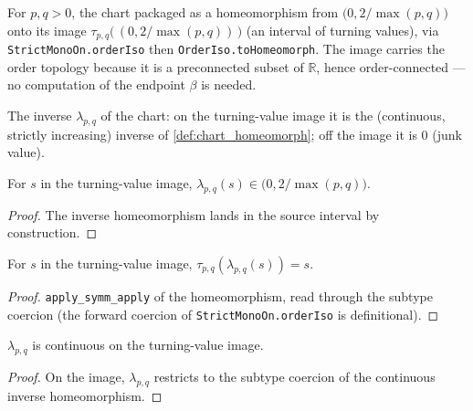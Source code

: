 \begin{definition}
  \label{def:chart_homeomorph}
  For $p, q > 0$, the chart packaged as a homeomorphism from
  $\bigl(0, 2/\max(p,q)\bigr)$ onto its image
  $\tau_{p,q}\bigl(\,(0, 2/\max(p,q))\,\bigr)$ (an interval of turning values),
  via \texttt{StrictMonoOn.orderIso} then \texttt{OrderIso.toHomeomorph}. The
  image carries the order topology because it is a preconnected subset of
  $\mathbb{R}$, hence order-connected --- no computation of the endpoint
  $\beta$ is needed.
\end{definition}

\begin{definition}
  \label{def:chart_inv}
  The inverse $\lambda_{p,q}$ of the chart: on the turning-value image it is
  the (continuous, strictly increasing) inverse of
  \cref{def:chart_homeomorph}; off the image it is $0$ (junk value).
\end{definition}

\begin{lemma}
  \label{lem:chart_inv_mem}
  For $s$ in the turning-value image, $\lambda_{p,q}(s) \in
  \bigl(0, 2/\max(p,q)\bigr)$.
\end{lemma}
\begin{proof}

\leanok
  The inverse homeomorphism lands in the source interval by construction.
\end{proof}

\begin{lemma}\leanok
[round-trip identity $\tau \circ \lambda = \mathrm{id}$]
  \label{lem:chart_map_chart_inv}
  For $s$ in the turning-value image, $\tau_{p,q}(\lambda_{p,q}(s)) = s$.
\end{lemma}
\begin{proof}

\leanok
  \texttt{apply\_symm\_apply} of the homeomorphism, read through the subtype
  coercion (the forward coercion of \texttt{StrictMonoOn.orderIso} is
  definitional).
\end{proof}

\begin{lemma}
  \label{lem:continuous_chart_inv}
  $\lambda_{p,q}$ is continuous on the turning-value image.
\end{lemma}
\begin{proof}

\leanok
  On the image, $\lambda_{p,q}$ restricts to the subtype coercion of the
  continuous inverse homeomorphism.
\end{proof}

